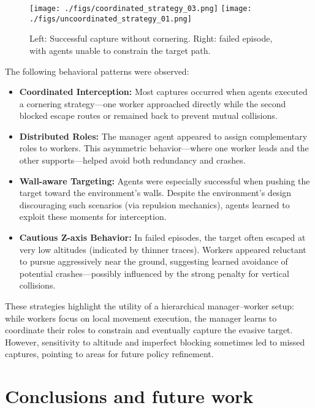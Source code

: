 \documentclass[12pt,a4paper,twoside,openany]{book}
\begin{document}
\begin{figure}[H]
\centering
\texttt{[image: ./figs/coordinated\_strategy\_03.png]}
\texttt{[image: ./figs/uncoordinated\_strategy\_01.png]}
\captionsetup{font=small}
\caption{Left: Successful capture without cornering. Right: failed episode, with agents unable to constrain the target path.}
\label{fig:chase_1}
\end{figure}

The following behavioral patterns were observed:

\begin{itemize}
    \item \textbf{Coordinated Interception:} Most captures occurred when agents executed a cornering strategy—one worker approached directly while the second blocked escape routes or remained back to prevent mutual collisions.
    
    \item \textbf{Distributed Roles:} The manager agent appeared to assign complementary roles to workers. This asymmetric behavior—where one worker leads and the other supports—helped avoid both redundancy and crashes.
    
    \item \textbf{Wall-aware Targeting:} Agents were especially successful when pushing the target toward the environment’s walls. Despite the environment’s design discouraging such scenarios (via repulsion mechanics), agents learned to exploit these moments for interception.
    
    \item \textbf{Cautious Z-axis Behavior:} In failed episodes, the target often escaped at very low altitudes (indicated by thinner traces). Workers appeared reluctant to pursue aggressively near the ground, suggesting learned avoidance of potential crashes—possibly influenced by the strong penalty for vertical collisions.
\end{itemize}

These strategies highlight the utility of a hierarchical manager–worker setup: while workers focus on local movement execution, the manager learns to coordinate their roles to constrain and eventually capture the evasive target. However, sensitivity to altitude and imperfect blocking sometimes led to missed captures, pointing to areas for future policy refinement.


\chapter{Conclusions and future work}
\end{document}
